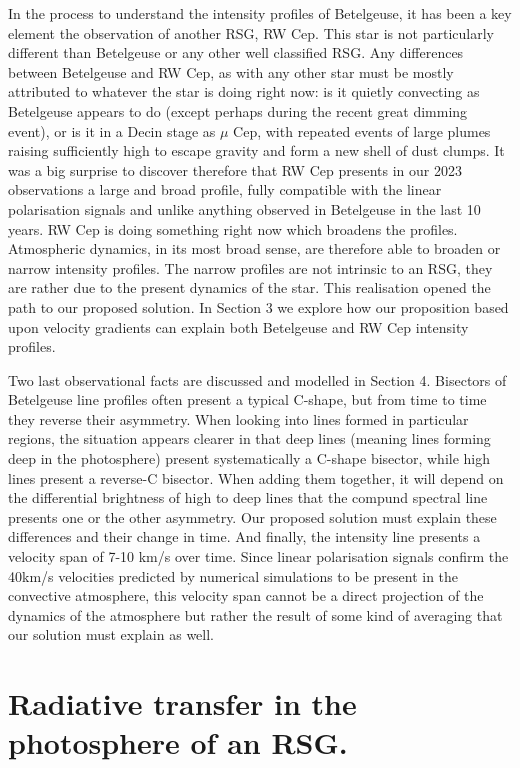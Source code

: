 \documentclass{/Users/art2/TeX/aanda/aa}
\begin{document}
In the process to understand the intensity profiles of Betelgeuse, it has been a key element the observation of another RSG, RW Cep. This star 
is not particularly different than Betelgeuse or any other well classified RSG. Any differences between Betelgeuse and RW Cep, as with any other star 
must be mostly attributed to whatever the star is doing right now: is it quietly convecting as Betelgeuse appears to do (except perhaps during 
the recent great dimming event), or is it in a Decin stage as $\mu$ Cep, with repeated events of large plumes raising sufficiently high to escape 
gravity and form a new shell of dust clumps. It was a big surprise to discover therefore that RW Cep presents in our 2023 observations a large and 
broad profile, fully compatible with the linear polarisation signals and unlike anything observed in Betelgeuse in the last 10 years. RW Cep is 
doing something right now which broadens the profiles. Atmospheric dynamics, in its most broad sense, are therefore able to broaden or narrow intensity 
profiles. The narrow profiles are not intrinsic to an RSG, they are rather due to the present dynamics of the star. This realisation opened the path 
to our proposed solution. In Section 3 we explore how our proposition based upon velocity gradients can explain both Betelgeuse and RW Cep intensity 
profiles.

Two last observational facts are discussed and modelled in Section 4. Bisectors of Betelgeuse line profiles often present a typical C-shape, but 
from time to time they reverse their asymmetry. When looking into lines formed in particular regions, the situation appears clearer in that deep 
lines (meaning lines forming deep in the photosphere) present systematically a C-shape bisector, while high lines present a reverse-C bisector. When
adding them together, it will depend on the differential brightness of high to deep lines that the compund spectral line presents one or the other asymmetry.
Our proposed solution must explain these differences and their change in time. And finally, the intensity line presents a velocity span of 7-10 km/s 
over time. Since linear polarisation signals confirm the 40km/s velocities  predicted by numerical simulations to be present in the convective atmosphere, 
this  velocity span cannot be a direct projection of the dynamics of the atmosphere but rather the result of some kind of averaging that our solution 
must explain as well.




\section{Radiative transfer in the photosphere of an RSG.}
\end{document}
